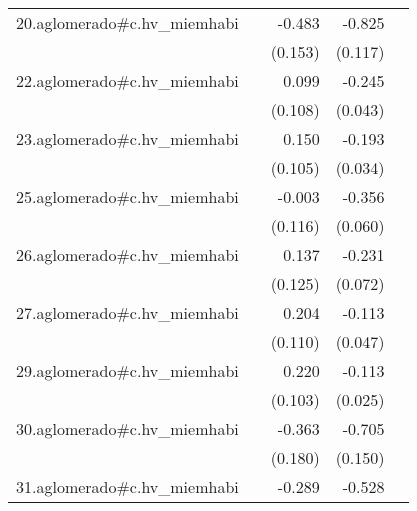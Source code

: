 {\begin{longtable}{l*{4}{D{.}{.}{-1}}}
\addlinespace
20.aglomerado#c.hv\_miemhabi&                     &      -0.483\sym{**} &      -0.825\sym{***}&                     \\
            &                     &     (0.153)         &     (0.117)         &                     \\
\addlinespace
22.aglomerado#c.hv\_miemhabi&                     &       0.099         &      -0.245\sym{***}&                     \\
            &                     &     (0.108)         &     (0.043)         &                     \\
\addlinespace
23.aglomerado#c.hv\_miemhabi&                     &       0.150         &      -0.193\sym{***}&                     \\
            &                     &     (0.105)         &     (0.034)         &                     \\
\addlinespace
25.aglomerado#c.hv\_miemhabi&                     &      -0.003         &      -0.356\sym{***}&                     \\
            &                     &     (0.116)         &     (0.060)         &                     \\
\addlinespace
26.aglomerado#c.hv\_miemhabi&                     &       0.137         &      -0.231\sym{**} &                     \\
            &                     &     (0.125)         &     (0.072)         &                     \\
\addlinespace
27.aglomerado#c.hv\_miemhabi&                     &       0.204         &      -0.113\sym{*}  &                     \\
            &                     &     (0.110)         &     (0.047)         &                     \\
\addlinespace
29.aglomerado#c.hv\_miemhabi&                     &       0.220\sym{*}  &      -0.113\sym{***}&                     \\
            &                     &     (0.103)         &     (0.025)         &                     \\
\addlinespace
30.aglomerado#c.hv\_miemhabi&                     &      -0.363\sym{*}  &      -0.705\sym{***}&                     \\
            &                     &     (0.180)         &     (0.150)         &                     \\
\addlinespace
31.aglomerado#c.hv\_miemhabi&                     &      -0.289\sym{*}  &      -0.528\sym{***}&                     \\

\end{longtable}}
